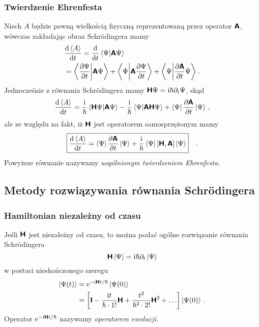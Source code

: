 \documentclass{myclass}
\begin{document}
\subsubsection{Twierdzenie Ehrenfesta}

Niech \(A\) będzie pewną wielkością fizyczną reprezentowaną przez operator \(\boldsymbol{\mathsf{A}}\), wówczas
zakładając obraz Schr\"{o}dingera mamy
\begin{equation*}
    \begin{split}
        &\dv{\expectationvalue{A}}{t} = \dv{}{t} \braket{\Psi}{\oper{A}\Psi} \\
        &= \braket{\pdv{\Psi}{t}}{\oper{A}\Psi} + \braket{\Psi}{\oper{A}\pdv{\Psi}{t}} + \braket{\Psi}{\pdv{\oper{A}}{t}\Psi}\,.
    \end{split}
\end{equation*}
Jednocześnie z równania Schr\"{o}dingera mamy \(\boldsymbol{\mathsf{H}}\Psi=\mathrm{i}\hbar{\partial_t\Psi}\), skąd
\begin{equation*}
    \dv{\expectationvalue{A}}{t} = \frac{\im}{\hbar}\braket{\oper{H}\Psi}{\oper{A}\Psi} - \frac{\im}{\hbar}\braket{\Psi}{\oper{A}\oper{H}\Psi} + \bra{\Psi}\pdv{\oper{A}}{t}\ket{\Psi}\,,
\end{equation*}
ale ze względu na fakt, iż \(\boldsymbol{\mathsf{H}}\) jest operatorem samosprzężonym mamy
\begin{equation*}
    \boxed{
    \dv{\expectationvalue{A}}{t} = \bra{\Psi}\pdv{\oper{A}}{t}\ket{\Psi} + \frac{\im}{\hbar}\bra{\Psi}[\oper{H},\oper{A}]\ket{\Psi}
    }\quad.
\end{equation*}
Powyższe równanie nazywamy \textit{uogólnionym twierdzeniem Ehrenfesta}.

\newpage
\subsection{Metody rozwiązywania równania Schr\"{o}dingera}

\subsubsection{Hamiltonian niezależny od czasu}

Jeśli \(\boldsymbol{\mathsf{H}}\) jest niezależny od czasu, to można podać ogólne rozwiązanie równania
Schr\"{o}dingera
\begin{equation*}
    \boldsymbol{\mathsf{H}}\ket{\Psi} = \mathrm{i}\hbar\partial_t\ket{\Psi}
\end{equation*}
w postaci nieskończonego szeregu
\begin{equation*}
    \begin{split}
    \ket{\Psi(t)} &= \mathrm{e}^{-\mathrm{i}\boldsymbol{\mathsf{H}}t/\hbar}\ket{\Psi(0)} \\
    &= \left[\boldsymbol{\mathsf{I}} - \frac{\mathrm{i} t}{\hbar\cdot1!}\boldsymbol{\mathsf{H}} + \frac{t^2}{\hbar^2\cdot2!}\boldsymbol{\mathsf{H}}^2+\ldots\right]\ket{\Psi(0)}\,.
    \end{split}
\end{equation*}
Operator \(\mathrm{e}^{-\mathrm{i}\boldsymbol{\mathsf{H}}t/\hbar}\) nazywamy \textit{operatorem ewolucji}.
\end{document}

